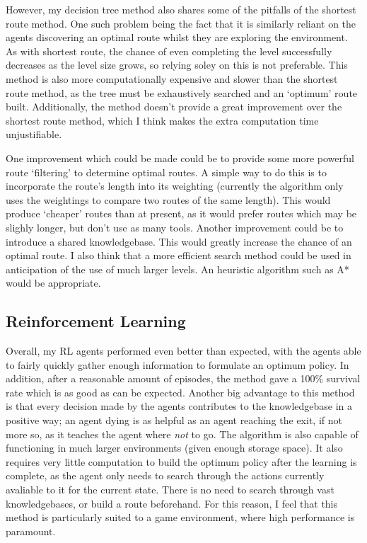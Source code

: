 \documentclass[a4paper,oneside]{report}
\begin{document}
However, my decision tree method also shares some of the pitfalls of the shortest route method. One such problem being the fact that it is similarly reliant on the agents discovering an optimal route whilst they are exploring the environment. As with shortest route, the chance of even completing the level successfully decreases as the level size grows, so relying soley on this is not preferable. This method is also more computationally expensive and slower than the shortest route method, as the tree must be exhaustively searched and an `optimum' route built. Additionally, the method doesn't provide a great improvement over the shortest route method, which I think makes the extra computation time unjustifiable.

One improvement which could be made could be to provide some more powerful route `filtering' to determine optimal routes. A simple way to do this is to incorporate the route's length into its weighting (currently the algorithm only uses the weightings to compare two routes of the same length). This would produce `cheaper' routes than at present, as it would prefer routes which may be slighly longer, but don't use as many tools. Another improvement could be to introduce a shared knowledgebase. This would greatly increase the chance of an optimal route. I also think that a more efficient search method could be used in anticipation of the use of much larger levels. An heuristic algorithm such as A* would be appropriate.

\subsection{Reinforcement Learning}

Overall, my RL agents performed even better than expected, with the agents able to fairly quickly gather enough information to formulate an optimum policy. In addition, after a reasonable amount of episodes, the method gave a 100\% survival rate which is as good as can be expected. Another big advantage to this method is that every decision made by the agents contributes to the knowledgebase in a positive way; an agent dying is as helpful as an agent reaching the exit, if not more so, as it teaches the agent where \emph{not} to go. The algorithm is also capable of functioning in much larger environments (given enough storage space). It also requires very little computation to build the optimum policy after the learning is complete, as the agent only needs to search through the actions currently avaliable to it for the current state. There is no need to search through vast knowledgebases, or build a route beforehand. For this reason, I feel that this method is particularly suited to a game environment, where high performance is paramount.
\end{document}
